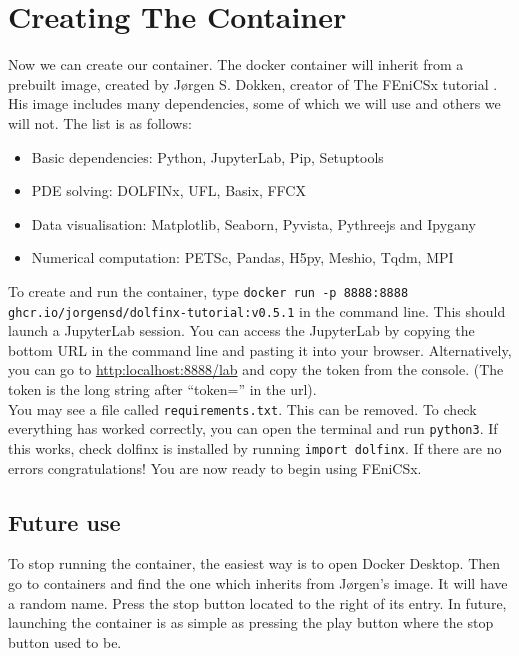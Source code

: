 \documentclass[11pt]{article}
\def\code#1{\texttt{#1}}
\begin{document}
\section{Creating The Container}
Now we can create our container. The docker container will inherit from a prebuilt image, created by Jørgen S. Dokken, creator of The FEniCSx tutorial \cite{jsdokken}. His image includes many dependencies, some of which we will use and others we will not. The list is as follows:
\begin{itemize}
\item Basic dependencies: Python, JupyterLab, Pip, Setuptools 
\item PDE solving: DOLFINx, UFL, Basix, FFCX
\item Data visualisation: Matplotlib, Seaborn, Pyvista, Pythreejs and Ipygany
\item Numerical computation: PETSc, Pandas, H5py, Meshio, Tqdm, MPI
\end{itemize}
To create and run the container, type \code{docker run -p 8888:8888 \\ ghcr.io/jorgensd/dolfinx-tutorial:v0.5.1} in the command line. This should launch a JupyterLab session. You can access the JupyterLab by copying the bottom URL in the command line and pasting it into your browser. Alternatively, you can go to \url{http:localhost:8888/lab} and copy the token from the console. (The token is the long string after ``token='' in the url). \\ You may see a file called \code{requirements.txt}. This can be removed. To check everything has worked correctly, you can open the terminal and run \code{python3}. If this works, check dolfinx is installed by running \code{import dolfinx}. If there are no errors congratulations! You are now ready to begin using FEniCSx.

\subsection{Future use}
To stop running the container, the easiest way is to open Docker Desktop. Then go to containers and find the one which inherits from Jørgen's image. It will have a random name. Press the stop button located to the right of its entry. In future, launching the container is as simple as pressing the play button where the stop button used to be.

\pagebreak
\end{document}
